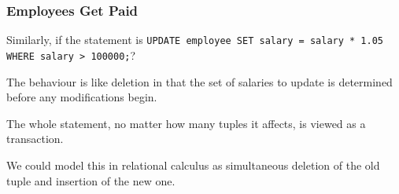 \begin{frame}
\frametitle{Employees Get Paid}

Similarly, if the statement is \texttt{UPDATE employee SET salary = salary * 1.05 WHERE salary > 100000;}?

The behaviour is like deletion in that the set of salaries to update is determined before any modifications begin. 

The whole statement, no matter how many tuples it affects, is viewed as a transaction. 

We could model this in relational calculus as simultaneous deletion of the old tuple and insertion of the new one. 


\end{frame}









